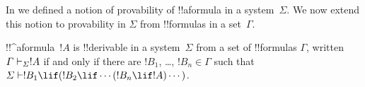\documentclass[../../../include/open-logic-section]{subfiles}
\begin{document}


In  we defined a notion of provability
of !!a{formula} in a system~$\Sigma$. We now extend this notion to
provability in $\Sigma$ from !!{formula}s in a set~$\Gamma$.

\begin{defn}
  !!^a{formula}~$!A$ is !!{derivable} in a system~$\Sigma$ from a set of
  !!{formula}s $\Gamma$, written $\Gamma \Proves[\Sigma] !A$ if and
  only if there are $!B_1$, \dots, $!B_n \in \Gamma$ such that
  $\Sigma \Proves !B_1 \lif (!B_2 \lif \cdots (!B_n \lif !A)
  \cdots)$. 
\end{defn}
\end{document}
